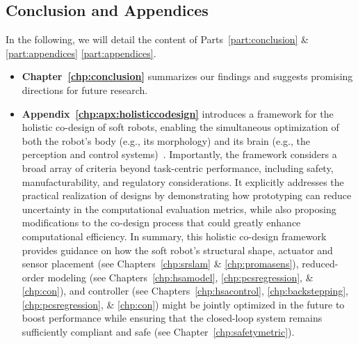 \subsection*{Conclusion and Appendices}
In the following, we will detail the content of Parts~\ref{part:conclusion} \& \ref{part:appendices} \ref{part:appendices}.
\begin{itemize}
    \item \textbf{Chapter~\ref{chp:conclusion}} summarizes our findings and suggests promising directions for future research.
    \item 
    \textbf{Appendix~\ref{chp:apx:holisticcodesign}} introduces a framework for the holistic co-design of soft robots, enabling the simultaneous optimization of both the robot’s body (e.g., its morphology) and its brain (e.g., the perception and control systems)~\citep{spielberg2019learning, wang2024diffusebot, navez2024contributions}. Importantly, the framework considers a broad array of criteria beyond task-centric performance, including safety, manufacturability, and regulatory considerations. It explicitly addresses the practical realization of designs by demonstrating how prototyping can reduce uncertainty in the computational evaluation metrics, while also proposing modifications to the co-design process that could greatly enhance computational efficiency. In summary, this holistic co-design framework provides guidance on how the soft robot’s structural shape, actuator and sensor placement (see Chapters~\ref{chp:srslam} \& \ref{chp:promasens}), reduced-order modeling (see Chapters~\ref{chp:hsamodel}, \ref{chp:pcsregression}, \& \ref{chp:con}), and controller (see Chapters~\ref{chp:hsacontrol}, \ref{chp:backstepping}, \ref{chp:pcsregression}, \& \ref{chp:con}) might be jointly optimized in the future to boost performance while ensuring that the closed-loop system remains sufficiently compliant and safe (see Chapter~\ref{chp:safetymetric}).

\end{itemize}
